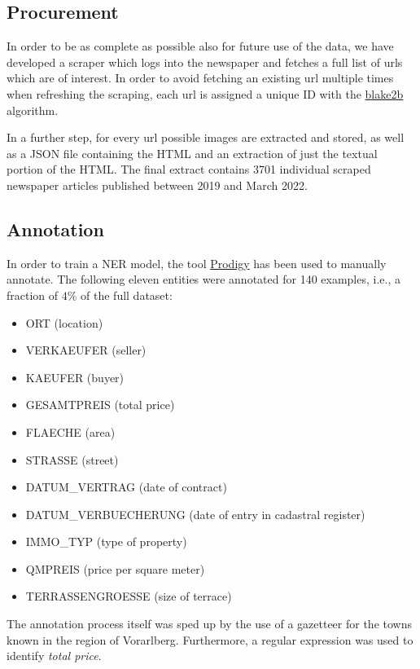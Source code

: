 \documentclass[11pt]{article}
\begin{document}
\subsection{Procurement}

In order to be as complete as possible also for future use of the data, we have developed a scraper which logs into the newspaper and fetches a full list of urls which are of interest. In order to avoid fetching an existing url multiple times when refreshing the scraping, each url is assigned a unique ID with the \href{https://www.blake2.net}{blake2b} algorithm. 

In a further step, for every url possible images are extracted and stored, as well as a JSON file containing the HTML and an extraction of just the textual portion of the HTML. The final extract contains 3701 individual scraped newspaper articles published between 2019 and March 2022. 

\subsection{Annotation}

In order to train a NER model, the tool \href{https://prodi.gy/}{Prodigy} has been used to manually annotate. The following eleven entities were annotated for 140 examples, i.e., a fraction of $4\%$ of the full dataset:

\begin{itemize}
    \item ORT (location)
    \item VERKAEUFER (seller)
    \item KAEUFER (buyer)
    \item GESAMTPREIS (total price)
    \item FLAECHE (area)
    \item STRASSE (street)
    \item DATUM\_VERTRAG (date of contract)
    \item DATUM\_VERBUECHERUNG (date of entry in cadastral register)
    \item IMMO\_TYP (type of property)
    \item QMPREIS (price per square meter)
    \item TERRASSENGROESSE (size of terrace)
\end{itemize}

The annotation process itself was sped up by the use of a gazetteer for the towns known in the region of Vorarlberg. Furthermore, a regular expression was used to identify \emph{total price}. 
\end{document}
